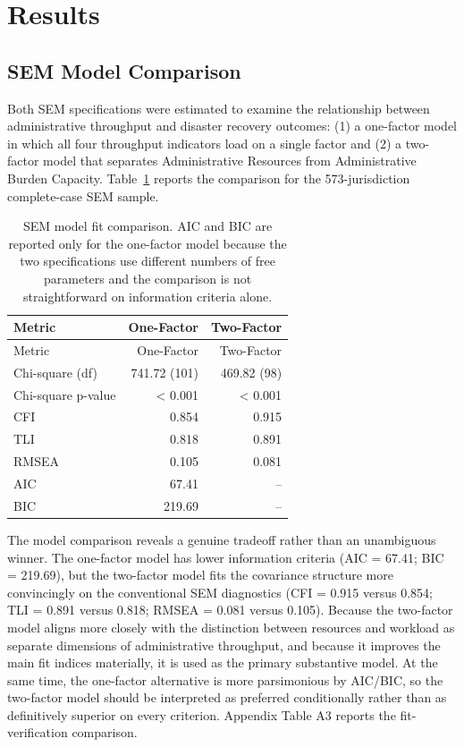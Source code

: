 \documentclass[
  number]{elsarticle}
\begin{document}
\section{Results}\label{results}

\subsection{SEM Model Comparison}\label{sem-model-comparison}

Both SEM specifications were estimated to examine the relationship
between administrative throughput and disaster recovery outcomes: (1) a
one-factor model in which all four throughput indicators load on a
single factor and (2) a two-factor model that separates Administrative
Resources from Administrative Burden Capacity.
Table~\ref{tbl-model-comparison} reports the comparison for the
573-jurisdiction complete-case SEM sample.

\begin{longtable}[]{@{}lrr@{}}
\caption{SEM model fit comparison. AIC and BIC are reported only for the
one-factor model because the two specifications use different numbers of
free parameters and the comparison is not straightforward on information
criteria alone.}\label{tbl-model-comparison}\tabularnewline
\toprule\noalign{}
Metric & One-Factor & Two-Factor \\
\midrule\noalign{}
\endfirsthead
\toprule\noalign{}
Metric & One-Factor & Two-Factor \\
\midrule\noalign{}
\endhead
\bottomrule\noalign{}
\endlastfoot
Chi-square (df) & 741.72 (101) & 469.82 (98) \\
Chi-square p-value & \textless{} 0.001 & \textless{} 0.001 \\
CFI & 0.854 & 0.915 \\
TLI & 0.818 & 0.891 \\
RMSEA & 0.105 & 0.081 \\
AIC & 67.41 & -- \\
BIC & 219.69 & -- \\
\end{longtable}

The model comparison reveals a genuine tradeoff rather than an
unambiguous winner. The one-factor model has lower information criteria
(AIC = 67.41; BIC = 219.69), but the two-factor model fits the
covariance structure more convincingly on the conventional SEM
diagnostics (CFI = 0.915 versus 0.854; TLI = 0.891 versus 0.818; RMSEA =
0.081 versus 0.105). Because the two-factor model aligns more closely
with the distinction between resources and workload as separate
dimensions of administrative throughput, and because it improves the
main fit indices materially, it is used as the primary substantive
model. At the same time, the one-factor alternative is more parsimonious
by AIC/BIC, so the two-factor model should be interpreted as preferred
conditionally rather than as definitively superior on every criterion.
Appendix Table A3 reports the fit-verification comparison.
\end{document}
